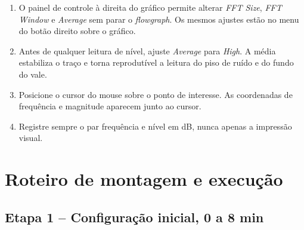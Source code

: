 \documentclass[11pt,a4paper]{article}
\begin{document}
\begin{instrucao}
\begin{enumerate}[label=\arabic*.]
  \item O painel de controle à direita do gráfico permite alterar
    \textit{FFT Size}, \textit{FFT Window} e \textit{Average} sem parar o
    \textit{flowgraph}. Os mesmos ajustes estão no menu do botão direito
    sobre o gráfico.
  \item Antes de qualquer leitura de nível, ajuste \textit{Average} para
    \textit{High}. A média estabiliza o traço e torna reprodutível a leitura
    do piso de ruído e do fundo do vale.
  \item Posicione o cursor do mouse sobre o ponto de interesse. As
    coordenadas de frequência e magnitude aparecem junto ao cursor.
  \item Registre sempre o par frequência e nível em dB, nunca apenas a
    impressão visual.
\end{enumerate}
\end{instrucao}

\section{Roteiro de montagem e execução}

\subsection*{Etapa 1 -- Configuração inicial, 0 a 8 min}
\end{document}
